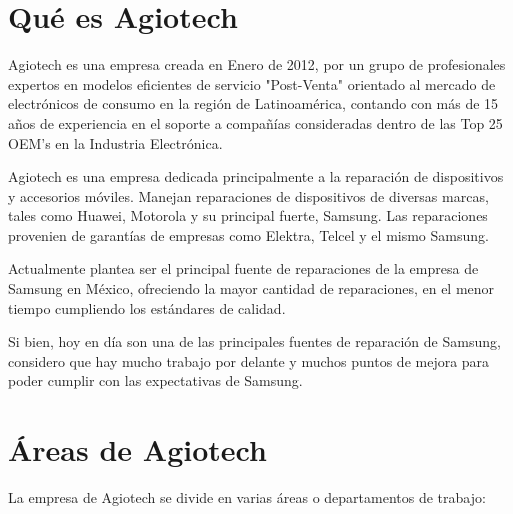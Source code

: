     \restoregeometry %

    \clearpage
    \tableofcontents




    \clearpage
    \vspace*{6pt}
    \centerline{\textbf{\huge \theTitle}}
    \vspace*{8pt}


    \section{Qué es Agiotech}

    Agiotech es una empresa creada en Enero de 2012, por un grupo de profesionales
    expertos en modelos eficientes de servicio "Post-Venta" orientado al mercado de
    electrónicos de consumo en la región de Latinoamérica, contando con más de 15 años de experiencia
    en el soporte a compañías consideradas dentro de las Top 25 OEM's en la Industria Electrónica.

    Agiotech es una empresa dedicada principalmente a la reparación de dispositivos y accesorios
    móviles. Manejan reparaciones de dispositivos de diversas marcas, tales como Huawei,
    Motorola y su principal fuerte, Samsung. Las reparaciones provenien de garantías de
    empresas como Elektra, Telcel y el mismo Samsung.

    Actualmente plantea ser el principal fuente de reparaciones de la empresa de Samsung en
    México, ofreciendo la mayor cantidad de reparaciones, en el menor tiempo cumpliendo los
    estándares de calidad.

    Si bien, hoy en día son una de las principales fuentes de reparación de Samsung, considero
    que hay mucho trabajo por delante y muchos puntos de mejora para poder cumplir con las
    expectativas de Samsung.

    \section{Áreas de Agiotech}

    La empresa de Agiotech se divide en varias áreas o departamentos de trabajo:

